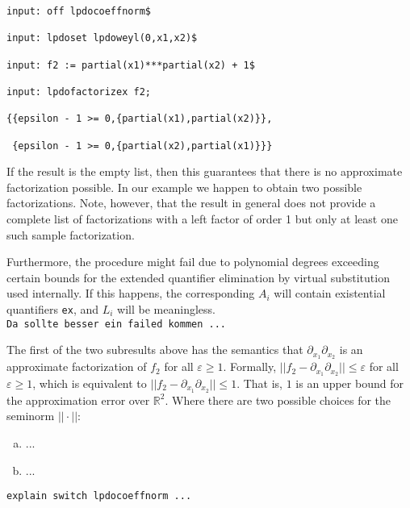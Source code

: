\documentclass[a4paper]{article}
\newcommand{\R}{\mathbb{R}}
\begin{document}
\begin{footnotesize}
\begin{verbatim}
input: off lpdocoeffnorm$

input: lpdoset lpdoweyl(0,x1,x2)$

input: f2 := partial(x1)***partial(x2) + 1$

input: lpdofactorizex f2;

{{epsilon - 1 >= 0,{partial(x1),partial(x2)}},

 {epsilon - 1 >= 0,{partial(x2),partial(x1)}}}
\end{verbatim}
\end{footnotesize}
If the result is the empty list, then this guarantees that there is no
approximate factorization possible. In our example we happen to obtain
two possible factorizations. Note, however, that the result in general
does not provide a complete list of factorizations with a left factor of
order 1 but only at least one such sample factorization.

Furthermore, the procedure might fail due to polynomial degrees
exceeding certain bounds for the extended quantifier elimination by
virtual substitution used internally. If this happens, the corresponding
$A_i$ will contain existential quantifiers \texttt{ex}, and $L_i$ will
be meaningless.\\
\verb!Da sollte besser ein failed kommen ...!

The first of the two subresults above has the semantics that
$\partial_{x_1}\partial_{x_2}$ is an approximate factorization of $f_2$
for all $\varepsilon\geq1$. Formally,
$||f_2-\partial_{x_1}\partial_{x_2}||\leq\varepsilon$ for all
$\varepsilon\geq1$, which is equivalent to
$||f_2-\partial_{x_1}\partial_{x_2}||\leq1$. That is, $1$ is an upper
bound for the approximation error over $\R^2$. Where there are two
possible choices for the seminorm $||\cdot||$:
\begin{enumerate}[(a)]
\item ...
\item ...
\end{enumerate}
\verb!explain switch lpdocoeffnorm ...!
\end{document}
